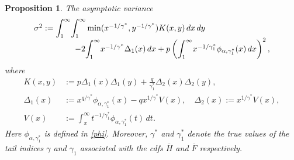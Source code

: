 \documentclass[reqno,openbib,runningheads,a4paper,12pt]{amsart}%
\newtheorem{proposition}{Proposition}[section]
\begin{document}
\begin{proposition}
\label{prop2} The asymptotic variance%
\begin{equation}%
\begin{array}
[c]{l}%
\sigma^{2}:=%
{\displaystyle\int\nolimits_{1}^{\infty}}
{\displaystyle\int\nolimits_{1}^{\infty}}
\min(x^{-1/\gamma^{\ast}},y^{-1/\gamma^{\ast}})K(x,y)\,dx\,dy\\
\ \ \ \ \ \ \ \ \ \ \ \ \ \ \ -2%
{\displaystyle\int\nolimits_{1}^{\infty}}
x^{-1/\gamma^{\ast}}\Delta_{1}(x)\,dx+p\left(
{\displaystyle\int\nolimits_{1}^{\infty}}
x^{-1/\gamma_{1}^{\ast}}\phi_{\alpha,\gamma_{1}^{\ast}}(x)\,dx\right)  ^{2},
\end{array}
\label{sigma}%
\end{equation}
where
\begin{align*}
K(x,y)  &  :=p\Delta_{1}(x)\Delta_{1}(y)+\frac{q}{\gamma_{1}^{\ast}}\Delta
_{2}(x)\Delta_{2}(y),\\
\Delta_{1}(x)  &  :=x^{q/\gamma^{\ast}}\phi_{\alpha,\gamma_{1}^{\ast}%
}(x)-qx^{1/\gamma^{\ast}}V(x),\quad\Delta_{2}(x):=x^{1/\gamma^{\ast}}V(x),\\
V(x)  &  :=\int_{x}^{\infty}t^{-1/\gamma_{1}^{\ast}}\phi_{\alpha,\gamma
_{1}^{\ast}}(t)\,dt.
\end{align*}
Here $\phi_{\alpha,\gamma_{1}^{\ast}}$ is defined in \ref{phi}. Moreover,
$\gamma^{\ast}$ and $\gamma_{1}^{\ast}$ denote the true values of the tail
indices $\gamma$ and $\gamma_{1}$ associated with the cdfs $\overline{H}$ and
$\overline{F}$ respectively.
\end{proposition}
\end{document}

